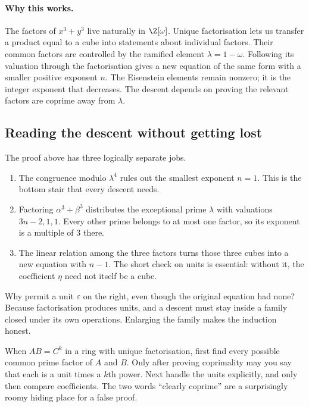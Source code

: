 \paragraph{Why this works.}
The factors of $x^3+y^3$ live naturally in $\Z[\omega]$. Unique factorisation lets us transfer a product equal to a cube into statements about individual factors. Their common factors are controlled by the ramified element $\lambda=1-\omega$. Following its valuation through the factorisation gives a new equation of the same form with a smaller positive exponent $n$. The Eisenstein elements remain nonzero; it is the integer exponent that decreases. The descent depends on proving the relevant factors are coprime away from $\lambda$.

\subsection*{Reading the descent without getting lost}
The proof above has three logically separate jobs.
\begin{enumerate}
\item The congruence modulo $\lambda^4$ rules out the smallest exponent $n=1$.
This is the bottom stair that every descent needs.
\item Factoring $\alpha^3+\beta^3$ distributes the exceptional prime $\lambda$
with valuations $3n-2,1,1$. Every other prime belongs to at most one factor,
so its exponent is a multiple of $3$ there.
\item The linear relation among the three factors turns those three cubes into
a new equation with $n-1$. The short check on units is essential: without it,
the coefficient $\eta$ need not itself be a cube.
\end{enumerate}
Why permit a unit $\varepsilon$ on the right, even though the original equation
had none? Because factorisation produces units, and a descent must stay inside
a family closed under its own operations. Enlarging the family makes the
induction honest.

\begin{reminder}
When $AB=C^k$ in a ring with unique factorisation, first find every possible
common prime factor of $A$ and $B$. Only after proving coprimality may you say
that each is a unit times a $k$th power. Next handle the units explicitly, and
only then compare coefficients. The two words ``clearly coprime'' are a
surprisingly roomy hiding place for a false proof.
\end{reminder}

